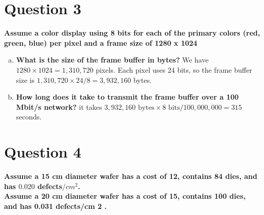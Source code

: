 \documentclass[12pt]{article}
\begin{document}
\section*{Question 3}
\textbf{Assume a color display using 8 bits for each of the primary colors (red, green, blue) per pixel
and a frame size of 1280 x 1024}
\begin{enumerate}[a)]
    \item \textbf{What is the size of the frame buffer in bytes?} We have $1280 \times 1024 = 1,310,720$ pixels. Each pixel uses 24 bits, so the frame buffer size is $1,310,720 \times 24 / 8 = 3,932,160$ bytes.
    \item \textbf{How long does it take to transmit the frame buffer over a 100 Mbit/s network?} it takes $3,932,160\text{ bytes} \times 8\text{ bits} / 100,000,000 = 315$ seconds.
\end{enumerate}

\section*{Question 4}
\textbf{Assume a 15 cm diameter wafer has a cost of 12, contains 84 dies, and has $0.020$ defects$/cm^2$. \\ Assume a 20 cm diameter wafer has a cost of 15, contains 100 dies, and has 0.031 defects/cm 2 .}
\end{document}
